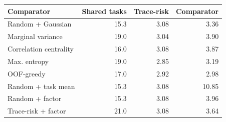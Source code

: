 \begin{tabular}{lrrr}
\toprule
Comparator & Shared tasks & Trace-risk & Comparator \\
\midrule
Random + Gaussian & 15.3 & 3.08 & 3.36 \\
Marginal variance & 19.0 & 3.04 & 3.90 \\
Correlation centrality & 16.0 & 3.08 & 3.87 \\
Max. entropy & 19.0 & 2.85 & 3.19 \\
OOF-greedy & 17.0 & 2.92 & 2.98 \\
Random + task mean & 15.3 & 3.08 & 10.85 \\
Random + factor & 15.3 & 3.08 & 3.96 \\
Trace-risk + factor & 21.0 & 3.08 & 3.64 \\
\bottomrule
\end{tabular}
